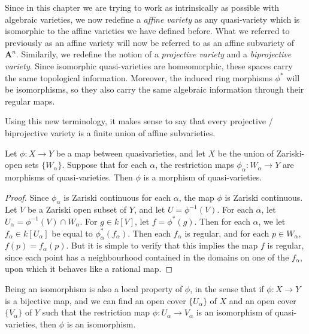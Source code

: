 Since in this chapter we are trying to work as intrinsically as possible with algebraic varieties, we now redefine a \emph{affine variety} as any quasi-variety which is isomorphic to the affine varieties we have defined before. What we referred to previously as an affine variety will now be referred to as an affine subvariety of $\mathbf{A}^n$. Similarily, we redefine the notion of a \emph{projective variety} and a \emph{biprojective variety}. Since isomorphic quasi-varieties are homeomorphic, these spaces carry the same topological information. Moreover, the induced ring morphisms $\phi^*$ will be isomorphisms, so they also carry the same algebraic information through their regular maps.

\begin{example}
    Using this new terminology, it makes sense to say that every projective / biprojective variety is a finite union of affine subvarieties.
\end{example}

\begin{theorem}
    Let $\phi: X \to Y$ be a map between quasivarieties, and let $X$ be the union of Zariski-open sets $\{ W_\alpha \}$. Suppose that for each $\alpha$, the restriction maps $\phi_\alpha: W_\alpha \to Y$ are morphisms of quasi-varieties. Then $\phi$ is a morphism of quasi-varieties.
\end{theorem}
\begin{proof}
    Since $\phi_\alpha$ is Zariski continuous for each $\alpha$, the map $\phi$ is Zariski continuous. Let $V$ be a Zariski open subset of $Y$, and let $U = \phi^{-1}(V)$. For each $\alpha$, let $U_\alpha = \phi^{-1}(V) \cap W_\alpha$. For $g \in k[V]$, let $f = \phi^*(g)$. Then for each $\alpha$, we let $f_\alpha \in k[U_\alpha]$ be equal to $\phi_\alpha^*(f_\alpha)$. Then each $f_\alpha$ is regular, and for each $p \in W_\alpha$, $f(p) = f_\alpha(p)$. But it is simple to verify that this implies the map $f$ is regular, since each point has a neighbourhood contained in the domains on one of the $f_\alpha$, upon which it behaves like a rational map.
\end{proof}

\begin{remark}
    Being an isomorphism is also a local property of $\phi$, in the sense that if $\phi: X \to Y$ is a bijective map, and we can find an open cover $\{ U_\alpha \}$ of $X$ and an open cover $\{ V_\alpha \}$ of $Y$ such that the restriction map $\phi: U_\alpha \to V_\alpha$ is an isomorphism of quasi-varieties, then $\phi$ is an isomorphism.
\end{remark}

